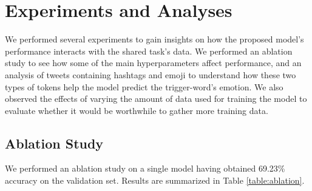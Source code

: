 \documentclass[11pt,a4paper]{article}
\begin{document}
\section{Experiments and Analyses}

We performed several experiments to gain insights on how the proposed model's performance interacts with the shared task's data. We performed an ablation study to see how some of the main hyperparameters affect performance, and an analysis of tweets containing hashtags and emoji to understand how these two types of tokens help the model predict the trigger-word's emotion. We also observed the effects of varying the amount of data used for training the model to evaluate whether it would be worthwhile to gather more training data.

\subsection{Ablation Study}%
\label{sub:ablation_study}

We performed an ablation study on a single model having obtained 69.23\% accuracy on the validation set. Results are summarized in Table \ref{table:ablation}.
\end{document}
